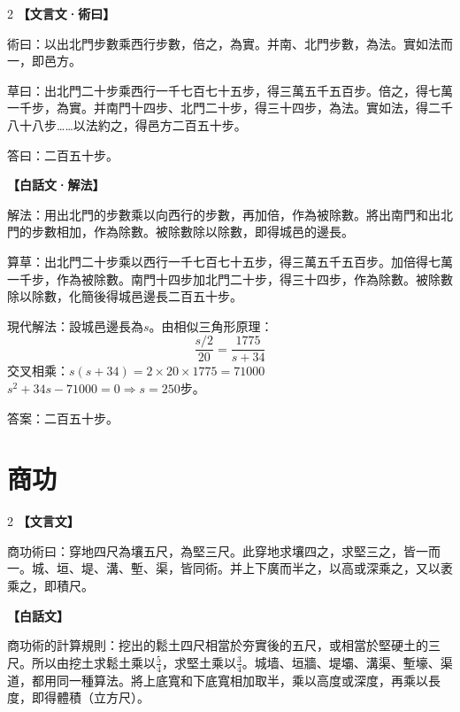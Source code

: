 \documentclass[11pt,a4paper]{article}
\newcommand{\zhc}{}[1]{{\CJKfamily{\CJKrmdefault}#1}}  %
\newcommand{\zhm}[1]{{\CJKfamily{\CJKrmdefault}#1}}  %
\newenvironment{prob bilingual}[1][]{%
  \begin{paracol}{2}%
  \setlength{\columnseprule}{0.4pt}%
}{%
  \end{paracol}%
  \medskip%
}
\begin{document}
\begin{paracol}{2}
\switchcolumn[0]
\noindent\textbf{\textcolor{notecolor}{\zhc{【文言文·術曰】}}}\par\smallskip
\zhc{
術曰：以出北門步數乘西行步數，倍之，為實。并南、北門步數，為法。實如法而一，即邑方。

草曰：出北門二十步乘西行一千七百七十五步，得三萬五千五百步。倍之，得七萬一千步，為實。并南門十四步、北門二十步，得三十四步，為法。實如法，得二千八十八步……以法約之，得邑方二百五十步。

答曰：二百五十步。
}

\switchcolumn[1]
\noindent\textbf{\textcolor{notecolor}{\zhm{【白話文·解法】}}}\par\smallskip
\zhm{
解法：用出北門的步數乘以向西行的步數，再加倍，作為被除數。將出南門和出北門的步數相加，作為除數。被除數除以除數，即得城邑的邊長。

算草：出北門二十步乘以西行一千七百七十五步，得三萬五千五百步。加倍得七萬一千步，作為被除數。南門十四步加北門二十步，得三十四步，作為除數。被除數除以除數，化簡後得城邑邊長二百五十步。

現代解法：設城邑邊長為$s$。由相似三角形原理：
$$\frac{s/2}{20} = \frac{1775}{s + 34}$$
交叉相乘：$s(s+34) = 2 \times 20 \times 1775 = 71000$\\
$s^2 + 34s - 71000 = 0 \Rightarrow s = 250$步。

答案：二百五十步。
}
\end{paracol}

\newpage

\section{\zhc{商功}}
\label{sec:shanggong}

\begin{paracol}{2}
\switchcolumn[0]
\noindent\textbf{\textcolor{notecolor}{\zhc{【文言文】}}}\par\smallskip
\zhc{
商功術曰：穿地四尺為壤五尺，為堅三尺。此穿地求壤四之，求堅三之，皆一而一。城、垣、堤、溝、塹、渠，皆同術。并上下廣而半之，以高或深乘之，又以袤乘之，即積尺。
}

\switchcolumn[1]
\noindent\textbf{\textcolor{notecolor}{\zhm{【白話文】}}}\par\smallskip
\zhm{
商功術的計算規則：挖出的鬆土四尺相當於夯實後的五尺，或相當於堅硬土的三尺。所以由挖土求鬆土乘以$\frac{5}{4}$，求堅土乘以$\frac{3}{4}$。城墙、垣牆、堤壩、溝渠、塹壕、渠道，都用同一種算法。將上底寬和下底寬相加取半，乘以高度或深度，再乘以長度，即得體積（立方尺）。
}
\end{paracol}
\end{document}
